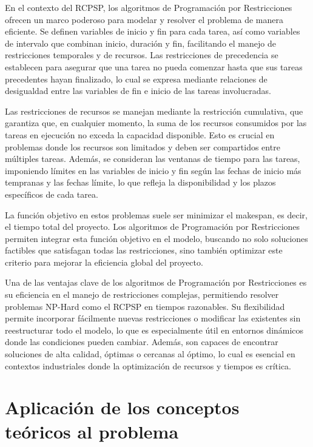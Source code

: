 \documentclass{article}
\begin{document}
En el contexto del RCPSP, los algoritmos de Programación por Restricciones ofrecen un marco poderoso para modelar y resolver el problema de manera eficiente. Se definen variables de inicio y fin para cada tarea, así como variables de intervalo que combinan inicio, duración y fin, facilitando el manejo de restricciones temporales y de recursos. Las restricciones de precedencia se establecen para asegurar que una tarea no pueda comenzar hasta que sus tareas precedentes hayan finalizado, lo cual se expresa mediante relaciones de desigualdad entre las variables de fin e inicio de las tareas involucradas.

Las restricciones de recursos se manejan mediante la restricción cumulativa, que garantiza que, en cualquier momento, la suma de los recursos consumidos por las tareas en ejecución no exceda la capacidad disponible. Esto es crucial en problemas donde los recursos son limitados y deben ser compartidos entre múltiples tareas. Además, se consideran las ventanas de tiempo para las tareas, imponiendo límites en las variables de inicio y fin según las fechas de inicio más tempranas y las fechas límite, lo que refleja la disponibilidad y los plazos específicos de cada tarea.

La función objetivo en estos problemas suele ser minimizar el makespan, es decir, el tiempo total del proyecto. Los algoritmos de Programación por Restricciones permiten integrar esta función objetivo en el modelo, buscando no solo soluciones factibles que satisfagan todas las restricciones, sino también optimizar este criterio para mejorar la eficiencia global del proyecto.

Una de las ventajas clave de los algoritmos de Programación por Restricciones es su eficiencia en el manejo de restricciones complejas, permitiendo resolver problemas NP-Hard como el RCPSP en tiempos razonables. Su flexibilidad permite incorporar fácilmente nuevas restricciones o modificar las existentes sin reestructurar todo el modelo, lo que es especialmente útil en entornos dinámicos donde las condiciones pueden cambiar. Además, son capaces de encontrar soluciones de alta calidad, óptimas o cercanas al óptimo, lo cual es esencial en contextos industriales donde la optimización de recursos y tiempos es crítica.


\section{Aplicación de los conceptos teóricos al problema}
\end{document}
